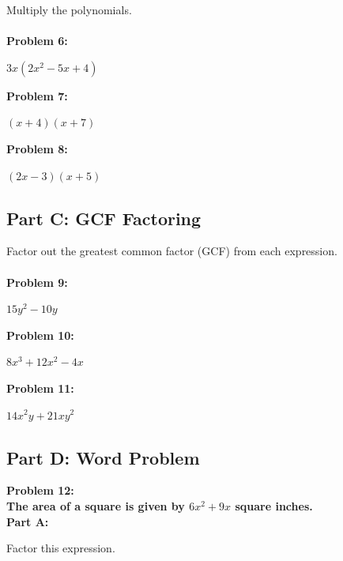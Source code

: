 \documentclass[12pt]{article}
\begin{document}
			Multiply the polynomials.\\\\

			\textbf{Problem 6:}
            
            $3x(2x^2 - 5x + 4)$

			\vspace{3cm}

			\textbf{Problem 7:}
            
            $(x + 4)(x + 7)$

			\vspace{3cm}

			\textbf{Problem 8:}
            
            $(2x - 3)(x + 5)$

			\newpage

		\subsection*{Part C: GCF Factoring}

			Factor out the greatest common factor (GCF) from each expression.\\\\

			\textbf{Problem 9:}
            
            $15y^2 - 10y$

			\vspace{3cm}

			\textbf{Problem 10:}
            
            $8x^3 + 12x^2 - 4x$

			\vspace{3cm}

			\textbf{Problem 11:}
            
            $14x^2y + 21xy^2$

			\newpage

		\subsection*{Part D: Word Problem}

			\textbf{Problem 12:}\\
			
			\textbf{The area of a square is given by $6x^2 + 9x$ square inches.}\\

			\textbf{Part A:}
            
            Factor this expression.
\end{document}
